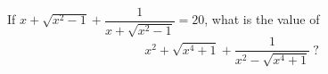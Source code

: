 If $x+\sqrt{x^2-1}+\dfrac{1}{x+\sqrt{x^2-1}}=20$, what is the value of
\[
x^2+\sqrt{x^4+1}+\dfrac{1}{x^2-\sqrt{x^4+1}}\ ?
\]
